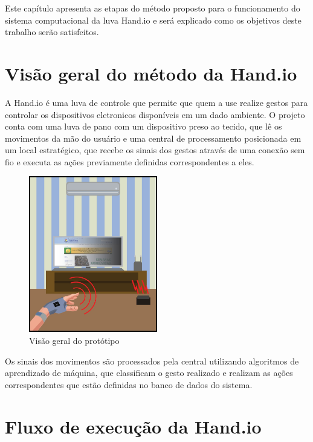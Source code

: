 Este capítulo apresenta as etapas do método proposto para o funcionamento do sistema computacional da luva Hand.io e será explicado como os objetivos deste trabalho serão satisfeitos. 

\section{Visão geral do método da Hand.io}

A Hand.io é uma luva de controle que permite que quem a use realize gestos para controlar os dispositivos eletronicos disponíveis em um dado ambiente. O projeto conta com uma luva de pano com um dispositivo preso ao tecido, que lê os movimentos da mão do usuário e uma central de processamento posicionada em um local estratégico, que recebe os sinais dos gestos através de uma conexão sem fio e executa as ações previamente definidas correspondentes a eles.

\begin{figure}[ht]
    \centering
    \includegraphics[width=0.5\textwidth, keepaspectratio]{resources/bigpicture.jpeg}
    \caption{Visão geral do protótipo}
    \label{fig:bigpicture}
\end{figure}

Os sinais dos movimentos são processados pela central utilizando algoritmos de aprendizado de máquina, que classificam o gesto realizado e realizam as ações correspondentes que estão definidas no banco de dados do sistema.


\section{Fluxo de execução da Hand.io}

